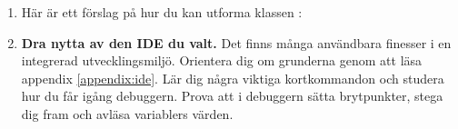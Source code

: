\begin{enumerate}[leftmargin=*]
\item Här är ett förslag på hur du kan utforma klassen :
%
%
%
%
%
%
%
%
%
%

\item \textbf{Dra nytta av den IDE du valt.} Det finns många användbara finesser i en integrerad utvecklingsmiljö. Orientera dig om grunderna genom att läsa appendix \ref{appendix:ide}. Lär dig några viktiga kortkommandon och studera hur du får igång debuggern. Prova att i debuggern sätta brytpunkter, stega dig fram och avläsa variablers värden.
\end{enumerate}
